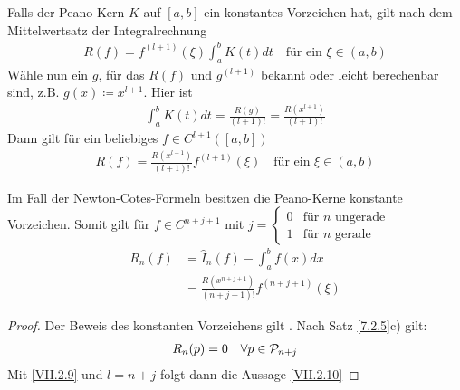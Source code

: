 \begin{Fole}\label{7.2.7}
  Falls der Peano-Kern $K$ auf $[a,b]$ ein konstantes Vorzeichen hat,
  gilt nach dem Mittelwertsatz der Integralrechnung
  \begin{gather}
    R(f) = f^{(l+1)}(\xi) \int_a^b K(t)dt 
    \quad \text{für ein }\xi\in (a,b)
    \label{VII.2.8}
  \end{gather}
  Wähle nun ein $g$, für das $R(f)$ und $g^{(l+1)}$ bekannt oder leicht
  berechenbar sind, z.B.
  $g(x)\coloneqq x^{l+1}$. Hier ist
  \begin{gather*}
    \int_a^bK(t)dt = \frac{R(g)}{(l+1)!} = \frac{R(x^{l+1})}{(l+1)!}
  \end{gather*}
  Dann gilt für ein beliebiges $f\in C^{l+1}([a,b])$
  \begin{gather}
    R(f) = \frac{R(x^{l+1})}{(l+1)!} f^{(l+1)}(\xi)
    \quad \text{für ein }\xi \in (a,b)
    \label{VII.2.9}
  \end{gather}
\end{Fole}

\begin{Satze}[Approximationsfehler]
  Im Fall der Newton-Cotes-Formeln besitzen die Peano-Kerne
  konstante Vorzeichen. Somit gilt für $f\in C^{n+j+1}$ mit 
  $j= \begin{cases}
    0 & \text{für $n$ ungerade}\\
    1 & \text{für $n$ gerade}
  \end{cases}$
  \begin{align}\nonumber
    R_n(f) &= \hat{I}_n (f) - \int_a^b f(x) dx\\
           &= \frac{R(x^{n+j+1})}{(n+j+1)!}f^{(n+j+1)}(\xi)
             \label{VII.2.10}
  \end{align}

  \begin{proof}
    Der Beweis des konstanten Vorzeichens gilt
    \cite[siehe][]{steffensen}.
    Nach Satz \ref{7.2.5}c) gilt:
    \begin{gather*}
      R_n(p) = 0 \quad\forall p\in\mathcal{P}_{n+j}
    \end{gather*}
    Mit \eqref{VII.2.9} und $l=n+j$ folgt dann die Aussage \eqref{VII.2.10}
  \end{proof}
\end{Satze}


